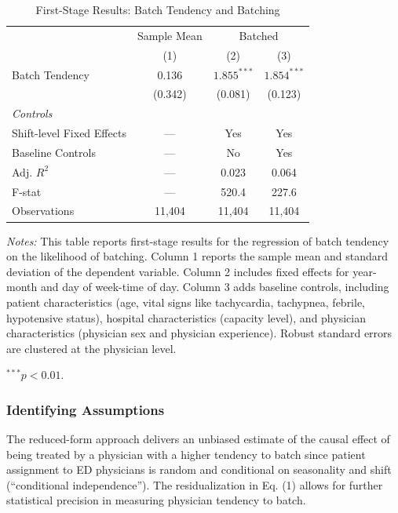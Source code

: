 \documentclass[,,nonblindrev]{informs}
\begin{document}
\begin{table}[ht]
\centering
\caption{First-Stage Results: Batch Tendency and Batching}
\label{tab:first_stage}
\begin{threeparttable}
\begin{tabular}{p{8cm}ccc}
\toprule
 & Sample Mean & \multicolumn{2}{c}{Batched} \\
\cmidrule(lr){3-4}
 & (1) & (2) & (3) \\
\midrule
Batch Tendency & 0.136 & $1.855^{***}$ & $1.854^{***}$ \\
 & (0.342) & (0.081) & (0.123) \\
\midrule
\textit{Controls} \\
Shift-level Fixed Effects & --- & Yes & Yes \\
Baseline Controls & --- & No & Yes \\
\midrule
Adj. $R^2$ & --- & 0.023 & 0.064 \\
F-stat & --- & 520.4 & 227.6 \\
Observations & 11,404 & 11,404 & 11,404 \\
\bottomrule
\end{tabular}
\begin{tablenotes}
\footnotesize
\item \textit{Notes:} This table reports first-stage results for the regression of batch tendency on the likelihood of batching. Column 1 reports the sample mean and standard deviation of the dependent variable. Column 2 includes fixed effects for year-month and day of week-time of day. Column 3 adds baseline controls, including patient characteristics (age, vital signs like tachycardia, tachypnea, febrile, hypotensive status), hospital characteristics (capacity level), and physician characteristics (physician sex and physician experience). Robust standard errors are clustered at the physician level.
\item $^{***} p < 0.01$.
\end{tablenotes}
\end{threeparttable}
\end{table}

\subsubsection{Identifying
Assumptions}\label{sec:identifying_assumptions}

The reduced-form approach delivers an unbiased estimate of the causal
effect of being treated by a physician with a higher tendency to batch
since patient assignment to ED physicians is random and conditional on
seasonality and shift (``conditional independence''). The
residualization in Eq. (1) allows for further statistical precision in
measuring physician tendency to batch.
\end{document}
